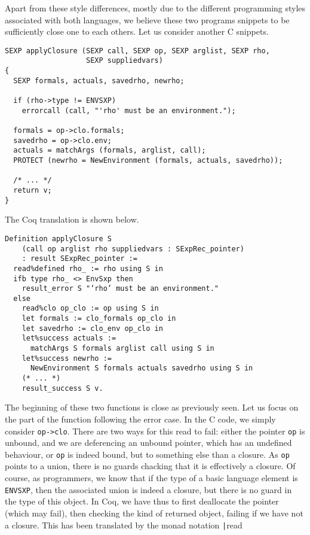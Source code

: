 \documentclass{article}
\newcommand\Coq{Coq}
\newcommand\Cn{C}
\begin{document}
Apart from these style differences,
mostly due to the different programming styles associated with both languages,
we believe these two programs snippets to be sufficiently close one to each others.
Let us consider another \Cn{} snippets.
\begin{verbatim}
SEXP applyClosure (SEXP call, SEXP op, SEXP arglist, SEXP rho,
                   SEXP suppliedvars)
{
  SEXP formals, actuals, savedrho, newrho;

  if (rho->type != ENVSXP)
    errorcall (call, "'rho' must be an environment.");

  formals = op->clo.formals;
  savedrho = op->clo.env;
  actuals = matchArgs (formals, arglist, call);
  PROTECT (newrho = NewEnvironment (formals, actuals, savedrho));

  /* ... */
  return v;
}
\end{verbatim}
The \Coq{} translation is shown below.
\begin{verbatim}
Definition applyClosure S
    (call op arglist rho suppliedvars : SExpRec_pointer)
    : result SExpRec_pointer :=
  read%defined rho_ := rho using S in
  ifb type rho_ <> EnvSxp then
    result_error S "‘rho’ must be an environment."
  else
    read%clo op_clo := op using S in
    let formals := clo_formals op_clo in
    let savedrho := clo_env op_clo in
    let%success actuals :=
      matchArgs S formals arglist call using S in
    let%success newrho :=
      NewEnvironment S formals actuals savedrho using S in
    (* ... *)
    result_success S v.
\end{verbatim}
The beginning of these two functions is close as previously seen.
Let us focus on the part of the function following the error case.
In the \Cn{} code, we simply consider \texttt{op->clo}.
There are two ways for this read to fail:
either the pointer \texttt{op} is unbound,
and we are deferencing an unbound pointer, which has an undefined behaviour,
or \texttt{op} is indeed bound,
but to something else than a closure.
As \texttt{op} points to a union, there is no guards
chacking that it is effectively a closure.
Of course, as programmers, we know that if the type of a basic language element
is \texttt{ENVSXP}, then the associated union is indeed a closure,
but there is no guard in the type of this object.
In \Coq{}, we have thus to first deallocate the pointer
(which may fail),
then checking the kind of returned object,
failing if we have not a closure.
This has been translated by the monad notation
\texttt|read%
\end{document}
